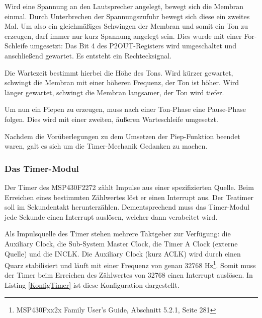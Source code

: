 \documentclass[12pt,a4paper,bibliography=totocnumbered,listof=totocnumbered]{scrartcl}
\begin{document}
Wird eine Spannung an den Lautsprecher angelegt, bewegt sich die Membran einmal. Durch Unterbrechen der Spannungszufuhr bewegt sich diese ein zweites Mal. Um also ein gleichmäßiges Schwingen der Membran und somit ein Ton zu erzeugen, darf immer nur kurz Spannung angelegt sein. Dies wurde mit einer For-Schleife umgesetzt: Das Bit 4 des P2OUT-Registers wird umgeschaltet und anschließend gewartet. Es entsteht ein Rechtecksignal.

\vspace{1em}


Die Wartezeit bestimmt hierbei die Höhe des Tons. Wird kürzer gewartet, schwingt die Membran mit einer höheren Frequenz, der Ton ist höher. Wird länger gewartet, schwingt die Membran langsamer, der Ton wird tiefer.

Um nun ein Piepen zu erzeugen, muss nach einer Ton-Phase eine Pause-Phase folgen. Dies wird mit einer zweiten, äußeren Warteschleife umgesetzt.

\vspace{1em}


Nachdem die Vorüberlegungen zu dem Umsetzen der Piep-Funktion beendet waren, galt es sich um die Timer-Mechanik Gedanken zu machen.

\subsubsection{Das Timer-Modul}
\label{TeatimerTimerA}

Der Timer des MSP430F2272 zählt Impulse aus einer spezifizierten Quelle. Beim Erreichen eines bestimmten Zählwertes löst er einen Interrupt aus. Der Teatimer soll im Sekundentakt herunterzählen. Dementsprechend muss das Timer-Modul jede Sekunde einen Interrupt auslösen, welcher dann verabeitet wird. 

Als Impulsquelle des Timer stehen mehrere Taktgeber zur Verfügung: die Auxiliary Clock, die Sub-System Master Clock, die Timer A Clock (externe Quelle) und die INCLK. Die Auxiliary Clock (kurz ACLK) wird durch einen Quarz stabilisiert und läuft mit einer Frequenz von genau 32768 Hz\footnote{MSP430Fxx2x Family User's Guide, Abschnitt 5.2.1, Seite 281}. Somit muss der Timer beim Erreichen des Zählwertes von 32768 einen Interrupt auslösen. In Listing \ref{KonfigTimer} ist diese Konfiguration dargestellt.

\vspace{1em}

\end{document}
